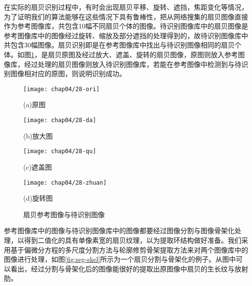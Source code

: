在实际的扇贝识别过程中，有时会出现扇贝平移、旋转、遮挡，焦距变化等情况，为了证明我们的算法能够在这些情况下具有鲁棒性，把从网络搜集的扇贝图像直接作为参考图像库，共包含10幅不同扇贝个体的图像。待识别图像库中的扇贝图像是参考图像库中的图像经过旋转、缩放及部分遮挡的处理得到的，故待识别图像库中共包含30幅图像。扇贝识别即是在参考图像库中找出与待识别图像相同的扇贝个体。如图\ref{fig:process}，是扇贝原图及经过放大、遮盖、旋转的扇贝图像，原图则放入参考图像库，经过处理的扇贝图像则放入待识别图像库，若能在参考图像中检测到与待识别图像相对应的原图，则说明识别成功。

\begin{figure}
\centering
  \begin{minipage}[b]{0.48\textwidth} 
      \centering 
      \texttt{[image: chap04/28-ori]}
        \centerline{(a)原图}\medskip
    \end{minipage}
  \begin{minipage}[b]{0.48\textwidth}
    \centering
    \texttt{[image: chap04/28-da]}
      \centerline{(b)放大图}\medskip
    \end{minipage}
  \begin{minipage}[b]{0.48\textwidth} 
      \centering 
      \texttt{[image: chap04/28-qu]}
        \centerline{(c)遮盖图}\medskip
    \end{minipage}
  \begin{minipage}[b]{0.48\textwidth}
    \centering
    \texttt{[image: chap04/28-zhuan]}
      \centerline{(d)旋转图}\medskip
  \end{minipage}
\caption{扇贝参考图像与待识别图像}
\label{fig:process}
\end{figure}

参考图像库中的图像与待识别图像库中的图像都要经过图像分割与图像骨架化处理，以得到二值化的具有单像素宽的扇贝纹理，以为提取环结构做好准备。我们采用基于偏微分方程的多尺度分割方法与轮廓修剪骨架提取方法来对两个图像库中的图像进行处理，如图\ref{fig:seg-skel}所示为一个扇贝分割与骨架化的例子。从图中可以看出，经过分割与骨架化后的图像能很好的提取出原图像中扇贝的生长纹与放射肋。

